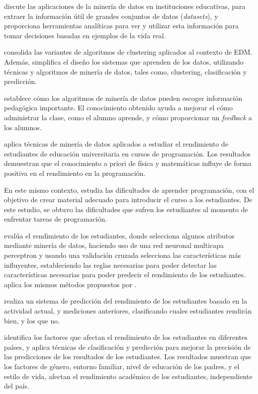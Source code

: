 \textcite{sarala2015empirical} discute las aplicaciones de la minería de datos en instituciones educativas, para extraer la información útil de grandes conjuntos de datos (\textit{datasets}), y proporciona herramientas analíticas para ver y utilizar esta información para tomar decisiones basadas en ejemplos de la vida real.

\textcite{dutt2015clustering} consolida las variantes de algoritmos de clustering aplicados al contexto de EDM. Además, simplifica el diseño los sistemas que aprenden de los datos, utilizando técnicas y algoritmos de minería de datos, tales como, clustering, clasificación y predicción.  

\textcite{merceron2005educational} establece cómo los algoritmos de minería de datos pueden escoger información pedagógica importante. El conocimiento obtenido ayuda a mejorar el cómo administrar la clase, como el alumno aprende, y cómo proporcionar un \textit{feedback} a los alumnos.

\textcite{akinola2012data} aplica técnicas de minería de datos aplicados a estudiar el rendimiento de estudiantes de educación universitaria en cursos de programación. Los resultados demuestran que el conocimiento a priori de física y matemáticas influye de forma positiva en el rendimiento en la programación.

En este mismo contexto, \textcite{lahtinen2005study} estudia las dificultades de aprender programación, con el objetivo de crear material adecuado para introducir el curso a los estudiantes. De este estudio, se obtuvo las dificultades que sufren los estudiantes al momento de enfrentar tareas de programación.

\textcite{borkar2014attributes} evalúa el rendimiento de los estudiantes, donde selecciona algunos atributos mediante minería de datos, haciendo uso de una red neuronal multicapa perceptron y usando una validación cruzada selecciona las características más influyentes, estableciendo las reglas necesarias para poder detectar las características necesarias para poder predecir el rendimiento de los estudiantes. \textcite{jayakameswaraiah2014study} aplica los mismos métodos propuestos por \textcite{borkar2014attributes}.

\textcite{abdullah2014students} realiza un sistema de predicción del rendimiento de los estudiantes basado en la actividad actual, y mediciones anteriores, clasificando cuales estudiantes rendirán bien, y los que no. 

\textcite{oskouei2014predicting} identifica los factores que afectan el rendimiento de los estudiantes en diferentes países, y aplica técnicas de clasificación y predicción para mejorar la precisión de las predicciones de los resultados de los estudiantes. Los resultados muestran que los factores de género, entorno familiar, nivel de educación de los padres, y el estilo de vida, afectan el rendimiento académico de los estudiantes, independiente del país.

